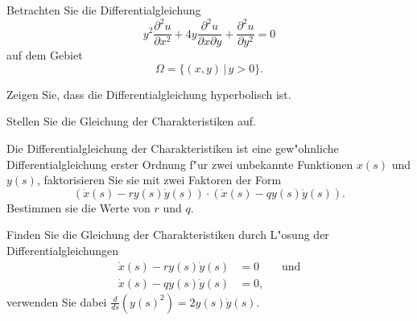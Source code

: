Betrachten Sie die Differentialgleichung
\[
y^2\frac{\partial^2 u}{\partial x^2}
+4y\frac{\partial^2u}{\partial x\partial y}
+\frac{\partial^2 u}{\partial y^2}=0
\]
auf dem Gebiet
\[
\Omega = \{ (x,y)\,|\, y >0\}.
\]
\begin{teilaufgaben}
\item Zeigen Sie, dass die Differentialgleichung hyperbolisch ist.
\item Stellen Sie die Gleichung der Charakteristiken auf.
\item Die Differentialgleichung der Charakteristiken ist eine
gew"ohnliche Differentialgleichung erster Ordnung f"ur zwei unbekannte
Funktionen $x(s)$ und $y(s)$, faktorisieren Sie sie mit zwei Faktoren
der Form
\[
(\dot x(s)-ry(s)\dot y(s))\cdot (\dot x(s)-qy(s)\dot y(s)).
\]
Bestimmen
sie die Werte von $r$ und $q$.
\item
Finden Sie die Gleichung der Charakteristiken durch
L"osung der Differentialgleichungen
\begin{align*}
\dot x(s) - ry(s)\dot y(s)&=0\qquad\text{und}\\
\dot x(s) - qy(s)\dot y(s)&=0,
\end{align*}
verwenden Sie dabei
$\frac{d}{ds}(y(s)^2)=2y(s)\dot y(s)$.
\end{teilaufgaben}


